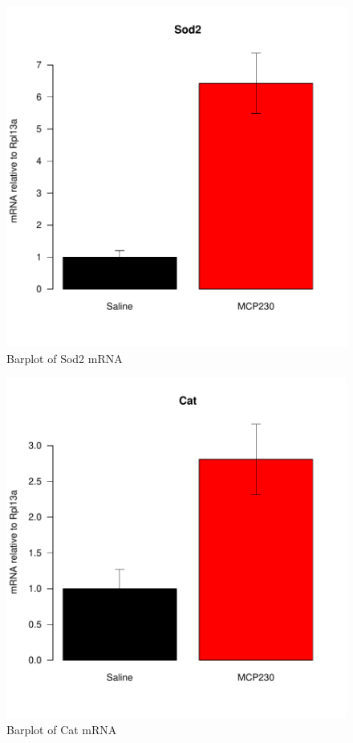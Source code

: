 \documentclass{article}
\begin{document}
\begin{figure}
\begin{center}
\includegraphics{MaternalParticulateAntioxDefense-barplotSod2}
\end{center}
\caption{Barplot of Sod2 mRNA}
\label{fig:barplotSod2}
\end{figure}

\begin{figure}
\begin{center}
\includegraphics{MaternalParticulateAntioxDefense-barplotCat}
\end{center}
\caption{Barplot of Cat mRNA}
\label{fig:barplotCat}
\end{figure}
\end{document}

